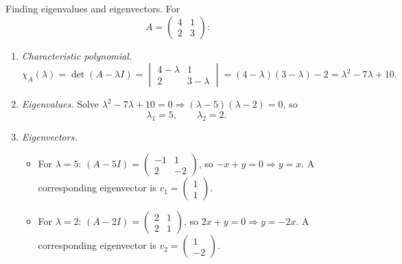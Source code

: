\documentclass[11pt]{article}
\def\textbf#1{#1}%
\def\mathbf#1{#1}%
\begin{document}
\begin{solution}
\textbf{Finding eigenvalues and eigenvectors.} For
\[
A=\begin{pmatrix}4&1\\[2pt]2&3\end{pmatrix}:
\]
\begin{enumerate}
\item \emph{Characteristic polynomial.}
\[
\chi_A(\lambda)=\det(A-\lambda I)=
\begin{vmatrix}4-\lambda&1\\[2pt]2&3-\lambda\end{vmatrix}
=(4-\lambda)(3-\lambda)-2
=\lambda^2-7\lambda+10.
\]

\item \emph{Eigenvalues.} Solve $\lambda^2-7\lambda+10=0\Rightarrow(\lambda-5)(\lambda-2)=0$, so
\[
\lambda_1=5,\qquad \lambda_2=2.
\]

\item \emph{Eigenvectors.}
\begin{itemize}
\item For $\lambda=5$: $(A-5I)=\begin{pmatrix}-1&1\\[2pt]2&-2\end{pmatrix}$, so $-x+y=0\Rightarrow y=x$.
A corresponding eigenvector is $\mathbf{v}_1=\begin{pmatrix}1\\[2pt]1\end{pmatrix}$.

\item For $\lambda=2$: $(A-2I)=\begin{pmatrix}2&1\\[2pt]2&1\end{pmatrix}$, so $2x+y=0\Rightarrow y=-2x$.
A corresponding eigenvector is $\mathbf{v}_2=\begin{pmatrix}1\\[2pt]-2\end{pmatrix}$.
\end{itemize}
\end{enumerate}
\end{solution}

\end{document}
